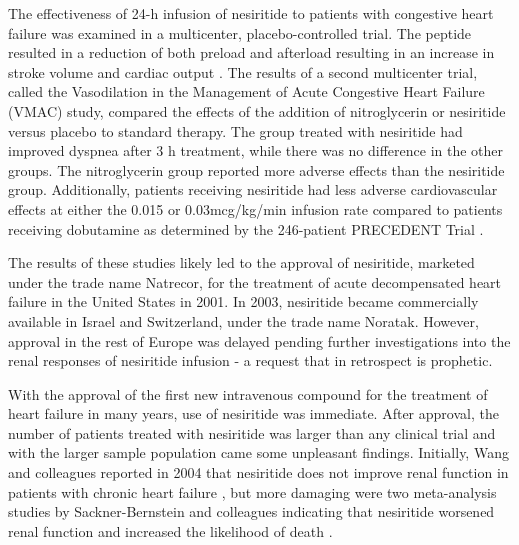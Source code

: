 \documentclass[14pt,a4paper,onecolumn]{extarticle}
\begin{document}
The effectiveness of 24-h infusion of nesiritide to patients with congestive heart failure was examined in a multicenter, placebo-controlled trial. The peptide resulted in a reduction of both preload and afterload resulting in an increase in stroke volume and cardiac output \citep{Mills1999}.
The results of a second multicenter trial, called the Vasodilation in the Management of Acute Congestive Heart Failure (VMAC) study, compared the effects of the addition of nitroglycerin or nesiritide versus placebo to standard therapy. The group treated with nesiritide had improved dyspnea after 3 h treatment, while there was no difference in the other groups. The nitroglycerin group reported more adverse effects than the nesiritide group. Additionally, patients receiving nesiritide had less adverse cardiovascular effects at either the 0.015 or 0.03mcg/kg/min infusion rate compared to patients receiving dobutamine as determined by the 246-patient PRECEDENT Trial \citep{deLissovoy2003}.  %

The results of these studies likely led to the approval of nesiritide, marketed under the trade name Natrecor, for the treatment of acute decompensated heart failure in the United States in 2001. In 2003, nesiritide became commercially available in Israel and Switzerland, under the trade name Noratak. However, approval in the rest of Europe was delayed pending further investigations into the renal responses of nesiritide infusion - a request that in retrospect is prophetic. %

With the approval of the first new intravenous compound for the treatment of heart failure in many years, use of nesiritide was immediate. After approval, the number of patients treated with nesiritide was larger than any clinical trial and with the larger sample population came some unpleasant findings. Initially, Wang and colleagues reported in 2004 that nesiritide does not improve renal function in patients with chronic heart failure \citep{Wang2004}, but more damaging were two meta-analysis studies by Sackner-Bernstein and colleagues indicating that nesiritide worsened renal function and increased the likelihood of death \citep{Sackner-Bernstein2005a} \citep{Sackner-Bernstein2005b}. %
\end{document}
